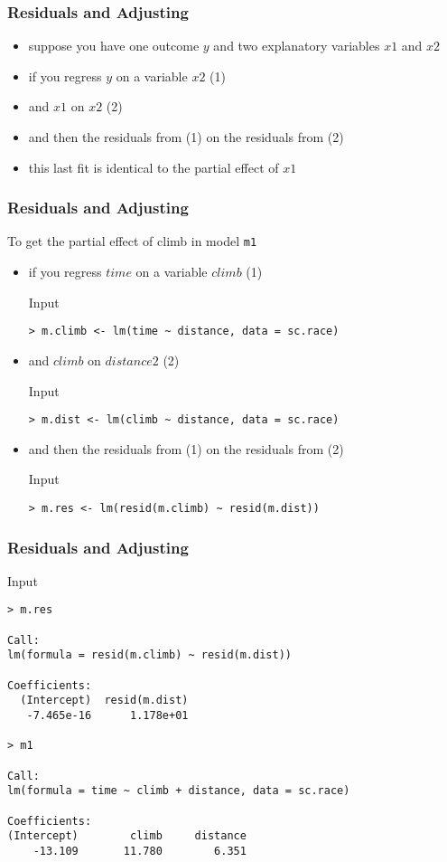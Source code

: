\begin{frame}[fragile]\frametitle{Residuals and Adjusting}
  \begin{itemize}
  \item suppose you have one outcome $y$ and two explanatory variables $x1$ and $x2$
  \item if you regress $y$ on a variable $x2$ (1)
  \item and $x1$ on $x2$ (2)
  \item and then the residuals from (1) on the residuals from (2)
  \item this last fit is identical to the partial effect of $x1$
  \end{itemize}
\end{frame}

\begin{frame}[fragile]\frametitle{Residuals and Adjusting}
  To get the partial effect of climb in model \texttt{m1}
  \begin{itemize}
  \item if you regress $time$ on a variable $climb$ (1)
    \begin{exampleblock}{Input}
\begin{verbatim}
> m.climb <- lm(time ~ distance, data = sc.race)
\end{verbatim}
    \end{exampleblock}
  \item and $climb$ on $distance2$ (2)
\begin{exampleblock}{Input}
\begin{verbatim}
> m.dist <- lm(climb ~ distance, data = sc.race)
\end{verbatim}
\end{exampleblock}
  \item and then the residuals from (1) on the residuals from (2)
\begin{exampleblock}{Input}
\begin{verbatim}
> m.res <- lm(resid(m.climb) ~ resid(m.dist))
\end{verbatim}
\end{exampleblock}
\end{itemize}
\end{frame}

\begin{frame}[fragile]\frametitle{Residuals and Adjusting}
\begin{exampleblock}{Input}\scriptsize
\begin{verbatim}
> m.res

Call:
lm(formula = resid(m.climb) ~ resid(m.dist))

Coefficients:
  (Intercept)  resid(m.dist)  
   -7.465e-16      1.178e+01  

> m1

Call:
lm(formula = time ~ climb + distance, data = sc.race)

Coefficients:
(Intercept)        climb     distance  
    -13.109       11.780        6.351  
\end{verbatim}
    \end{exampleblock}
\end{frame}



